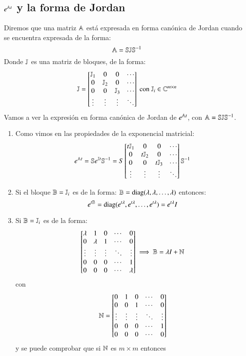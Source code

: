 \subsection{$e^{\mathbb{A} t}$ y la forma de Jordan}
Diremos que una matriz $\mathbb{A}$ está expresada en forma canónica de Jordan cuando se encuentra expresada de la forma:
$$
    \mathbb{A} = \mathbb{S} \mathbb{J} \mathbb{S}^{-1}
$$
Donde $\mathbb{J}$ es una matriz de bloques, de la forma:
$$
\J = \mx{\J_1 & 0 & 0 & \cdots \\
    0  & \J_2 & 0 & \cdots\\
    0 & 0 & \J_3 & \cdots\\
    \vdots & \vdots & \vdots & \ddots} \text{ con } \J_i \in \C^{m\times n}
$$
Vamos a ver la expresión en forma canónica de Jordan de $e^{\mathbb{A} t}$, con $\mathbb{A} =  \mathbb{S} \mathbb{J} \mathbb{S}^{-1}$.\\
\begin{enumerate}
    \item Como vimos en las propiedades de la exponencial matricial:
    $$
        e^{\A t} = \S e^{\J t} \S^{-1} = S \mx{t\J_1 & 0 & 0 & \cdots \\
            0  & t\J_2 & 0 & \cdots\\
            0 & 0 & t\J_3 & \cdots\\
            \vdots & \vdots & \vdots & \ddots} \S^{-1}
    $$
    \item Si el bloque $\mathbb{B} = \mathbb{J}_i$ es de la forma: $\mathbb{B} = \operatorname{diag}(\lambda, \lambda, \ldots, \lambda)$ entonces:
    $$
        e^{t\mathbb{B}} = \operatorname{diag}(e^{t\lambda},e^{t\lambda},\ldots, e^{t\lambda}) = e^{t\lambda} I
    $$
    \item Si $\mathbb{B} = \mathbb{J}_i$ es de la forma:
    $$
    \mx{\lambda & 1 & 0  &\cdots & 0\\
            0 & \lambda & 1  &\cdots & 0\\
        \vdots & \vdots & \vdots & \ddots &\vdots\\
        0 & 0 & 0 & \cdots & 1\\
        0 & 0 & 0 & \cdots & \lambda\\
    } \implies \B = \lambda I +\N
    $$ con
    $$
        \N = \mx{0 & 1 & 0  &\cdots & 0\\
                0 & 0 & 1  &\cdots & 0\\
            \vdots & \vdots & \vdots & \ddots &\vdots\\
            0 & 0 & 0 & \cdots & 1\\
            0 & 0 & 0 & \cdots & 0\\
        }
    $$
    y se puede comprobar que si $\mathbb{N}$ es $m\times m$ entonces

\end{enumerate}
